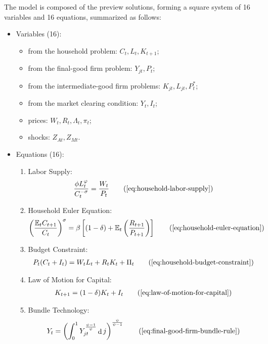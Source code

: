 \documentclass[
	12pt, 
	]{article}
\numberwithin{equation}{section}
\DeclareMathOperator{\dif}{d}
\theoremstyle{definition}
\theoremstyle{plain}
\theoremstyle{plain}
\theoremstyle{plain}
\begin{document}
The model is composed of the preview solutions, forming a square system of 16 variables and 16 equations, summarized as follows:

{\singlespacing
	
\begin{itemize}
	\item Variables (16):

\begin{itemize}
	\item from the household problem: $C_t, L_t, K_{t+1}$;
	\item from the final-good firm problem: $Y_{jt}, P_t$;
	\item from the intermediate-good firm problems: $K_{jt}, L_{jt}, P_t^\ast$;
	\item from the market clearing condition: $Y_t, I_t$;
	\item prices: $W_t, R_t, \Lambda_t, \pi_t$;
	\item shocks: $Z_{At}, Z_{Mt}$.
\end{itemize}
	\item Equations (16):

\begin{enumerate}
	\item Labor Supply:
	\begin{align}
		\frac{\phi L_t^{\varphi}}{C_t^{-\sigma}} = \frac{W_t}{P_t}
		\tag{\ref{eq:household-labor-supply}}
	\end{align}
		
	\item Household Euler Equation:
	\begin{align}
		\left( \frac{\mathbb{E}_t C_{t+1}}{C_t} \right)^\sigma = \beta \left[ (1-\delta) + \mathbb{E}_t \left(\frac{R_{t+1}}{P_{t+1}}\right) \right]
		\tag{\ref{eq:household-euler-equation}}
	\end{align}
		
	\item Budget Constraint: 
	\begin{align}
		P_t (C_t + I_t) = W_t L_t + R_t K_t + \Pi_t
		\tag{\ref{eq:household-budget-constraint}}
	\end{align}
		
	\item Law of Motion for Capital:
	\begin{align}
		K_{t+1} = (1-\delta)K_t + I_t
		\tag{\ref{eq:law-of-motion-for-capital}}
	\end{align}
			
	\item Bundle Technology:
	\begin{align}
		Y_t = \left( \int_{0}^{1} Y_{jt}^{\frac{\psi-1}{\psi}} \dif j \right)^{\frac{\psi}{\psi-1}}
		\tag{\ref{eq:final-good-firm-bundle-rule}}
	\end{align}
	

\end{enumerate}
\end{itemize}}
\end{document}

